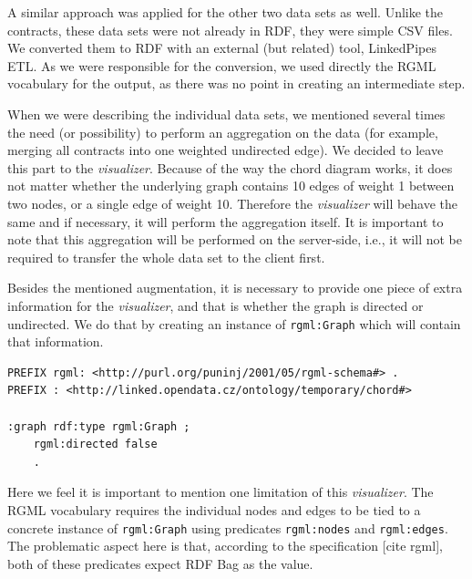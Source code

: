 A similar approach was applied for the other two data sets as well. Unlike the contracts, these data sets were not already in RDF, they were simple CSV files. We converted them to RDF with an external (but related) tool, LinkedPipes ETL. As we were responsible for the conversion, we used directly the RGML vocabulary for the output, as there was no point in creating an intermediate step.

When we were describing the individual data sets, we mentioned several times the need (or possibility) to perform an aggregation on the data (for example, merging all contracts into one weighted undirected edge). We decided to leave this part to the \emph{visualizer}. Because of the way the chord diagram works, it does not matter whether the underlying graph contains 10 edges of weight 1 between two nodes, or a single edge of weight 10. Therefore the \emph{visualizer} will behave the same and if necessary, it will perform the aggregation itself. It is important to note that this aggregation will be performed on the server-side, i.e., it will not be required to transfer the whole data set to the client first. 

Besides the mentioned augmentation, it is necessary to provide one piece of extra information for the \emph{visualizer}, and that is whether the graph is directed or undirected. We do that by creating an instance of \texttt{rgml:Graph} which will contain that information.

\begin{verbatim}
PREFIX rgml: <http://purl.org/puninj/2001/05/rgml-schema#> .
PREFIX : <http://linked.opendata.cz/ontology/temporary/chord#>

:graph rdf:type rgml:Graph ;
    rgml:directed false
    .
\end{verbatim}


Here we feel it is important to mention one limitation of this \emph{visualizer}. The RGML vocabulary requires the individual nodes and edges to be tied to a concrete instance of \texttt{rgml:Graph} using predicates \texttt{rgml:nodes} and \texttt{rgml:edges}. The problematic aspect here is that, according to the specification [cite rgml], both of these predicates expect RDF Bag as the value.

